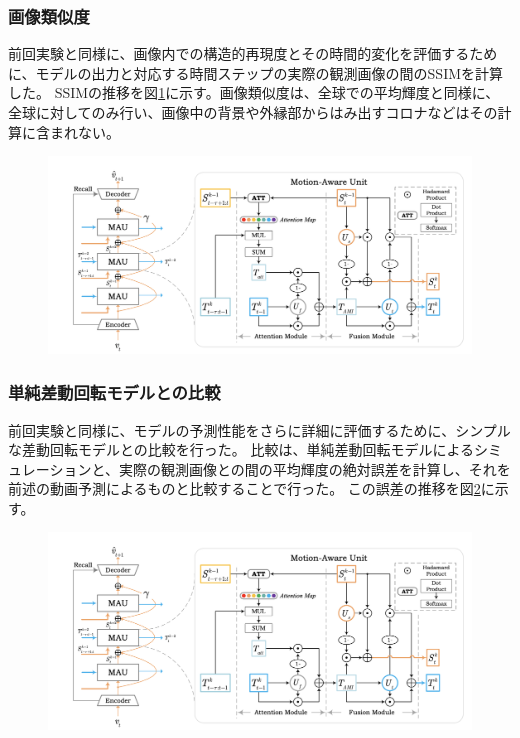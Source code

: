       \subsubsection{画像類似度}
        前回実験と同様に、画像内での構造的再現度とその時間的変化を評価するために、モデルの出力と対応する時間ステップの実際の観測画像の間のSSIMを計算した。
        SSIMの推移を図\ref{fig:exp2_ssim_line}に示す。画像類似度は、全球での平均輝度と同様に、全球に対してのみ行い、画像中の背景や外縁部からはみ出すコロナなどはその計算に含まれない。
        \begin{figure}[h]
          \centering
          \includegraphics[width=\textwidth]{figures/mau.png}
          \caption{}
          \label{fig:exp2_ssim_line}
        \end{figure}

      \subsubsection{単純差動回転モデルとの比較}
        前回実験と同様に、モデルの予測性能をさらに詳細に評価するために、シンプルな差動回転モデルとの比較を行った。
        比較は、単純差動回転モデルによるシミュレーションと、実際の観測画像との間の平均輝度の絶対誤差を計算し、それを前述の動画予測によるものと比較することで行った。
        この誤差の推移を図\ref{fig:exp2_sdr_line}に示す。

        \begin{figure}[h]
          \centering
          \includegraphics[width=\textwidth]{figures/mau.png}
          \caption{}
          \label{fig:exp2_sdr_line}
        \end{figure}
        
